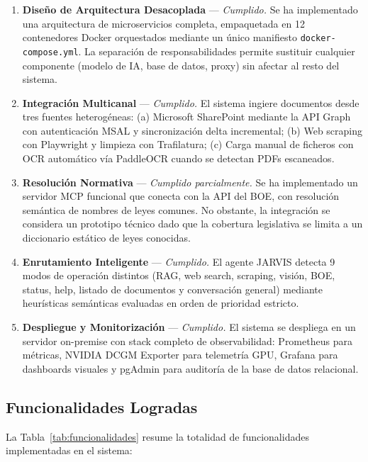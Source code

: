 \begin{enumerate}
    \item \textbf{Diseño de Arquitectura Desacoplada} --- \textit{Cumplido.} Se ha implementado una arquitectura de microservicios completa, empaquetada en 12 contenedores Docker orquestados mediante un único manifiesto \texttt{docker-compose.yml}. La separación de responsabilidades permite sustituir cualquier componente (modelo de IA, base de datos, proxy) sin afectar al resto del sistema.

    \item \textbf{Integración Multicanal} --- \textit{Cumplido.} El sistema ingiere documentos desde tres fuentes heterogéneas: (a) Microsoft SharePoint mediante la API Graph con autenticación MSAL y sincronización delta incremental; (b) Web scraping con Playwright y limpieza con Trafilatura; (c) Carga manual de ficheros con OCR automático vía PaddleOCR cuando se detectan PDFs escaneados.

    \item \textbf{Resolución Normativa} --- \textit{Cumplido parcialmente.} Se ha implementado un servidor MCP funcional que conecta con la API del BOE, con resolución semántica de nombres de leyes comunes. No obstante, la integración se considera un prototipo técnico dado que la cobertura legislativa se limita a un diccionario estático de leyes conocidas.

    \item \textbf{Enrutamiento Inteligente} --- \textit{Cumplido.} El agente JARVIS detecta 9 modos de operación distintos (RAG, web search, scraping, visión, BOE, status, help, listado de documentos y conversación general) mediante heurísticas semánticas evaluadas en orden de prioridad estricto.

    \item \textbf{Despliegue y Monitorización} --- \textit{Cumplido.} El sistema se despliega en un servidor on-premise con stack completo de observabilidad: Prometheus para métricas, NVIDIA DCGM Exporter para telemetría GPU, Grafana para dashboards visuales y pgAdmin para auditoría de la base de datos relacional.
\end{enumerate}

\subsection{Funcionalidades Logradas}
La Tabla~\ref{tab:funcionalidades} resume la totalidad de funcionalidades implementadas en el sistema:

